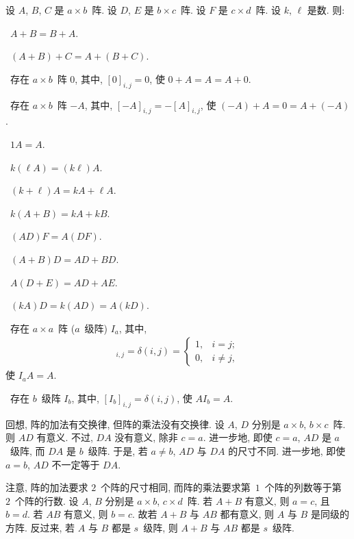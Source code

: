 \documentclass[../libro.tex]{subfiles}
\begin{document}
\begin{theorem}
    设 \(A\), \(B\), \(C\) 是 \(a \times b\)~阵.
    设 \(D\), \(E\) 是 \(b \times c\)~阵.
    设 \(F\) 是 \(c \times d\)~阵.
    设 \(k\), \(\ell\) 是数.
    则:

    \textbullet\,
    \(A + B = B + A\).

    \textbullet\,
    \((A + B) + C = A + (B + C)\).

    \textbullet\,
    存在 \(a \times b\)~阵 \(0\),
    其中, \([0]_{i,j} = 0\),
    使 \(0 + A = A = A + 0\).

    \textbullet\,
    存在 \(a \times b\)~阵 \(-A\),
    其中, \([-A]_{i,j} = -[A]_{i,j}\),
    使 \((-A) + A = 0 = A + (-A)\).

    \textbullet\,
    \(1 A = A\).

    \textbullet\,
    \(k (\ell A) = (k \ell) A\).

    \textbullet\,
    \((k + \ell) A = k A + \ell A\).

    \textbullet\,
    \(k (A + B) = k A + k B\).

    \textbullet\,
    \((A D) F = A (D F)\).

    \textbullet\,
    \((A + B) D = A D + B D\).

    \textbullet\,
    \(A (D + E) = A D + A E\).

    \textbullet\,
    \((k A) D = k (A D) = A (k D)\).

    \textbullet\,
    存在 \(a \times a\)~阵 (\(a\)~级阵) \(I_a\),
    其中,
    \begin{align*}
        [I_a]_{i,j} = \delta(i, j) =
        \begin{cases}
            1, & i = j; \\
            0, & i \neq j,
        \end{cases}
    \end{align*}
    使 \(I_a A = A\).

    \textbullet\,
    存在 \(b\)~级阵 \(I_b\),
    其中, \([I_b]_{i,j} = \delta(i, j)\),
    使 \(A I_b = A\).
\end{theorem}

回想, 阵的加法有交换律, 但阵的乘法没有交换律.
设 \(A\), \(D\) 分别是 \(a \times b\), \(b \times c\)~阵.
则 \(A D\) 有意义.
不过, \(D A\) 没有意义, 除非 \(c = a\).
进一步地, 即使 \(c = a\),
\(A D\) 是 \(a\)~级阵, 而 \(D A\) 是 \(b\)~级阵.
于是, 若 \(a \neq b\), \(A D\) 与 \(D A\) 的尺寸不同.
进一步地, 即使 \(a = b\), \(A D\) 不一定等于 \(D A\).

注意, 阵的加法要求 \(2\)~个阵的尺寸相同,
而阵的乘法要求第~\(1\)~个阵的列数等于第~\(2\)~个阵的行数.
设 \(A\), \(B\) 分别是 \(a \times b\), \(c \times d\)~阵.
若 \(A + B\) 有意义, 则 \(a = c\), 且 \(b = d\).
若 \(A B\) 有意义, 则 \(b = c\).
故若 \(A + B\) 与 \(A B\) 都有意义,
则 \(A\) 与 \(B\) 是同级的方阵.
反过来, 若 \(A\) 与 \(B\) 都是 \(s\)~级阵,
则 \(A + B\) 与 \(A B\) 都是 \(s\)~级阵.
\end{document}
